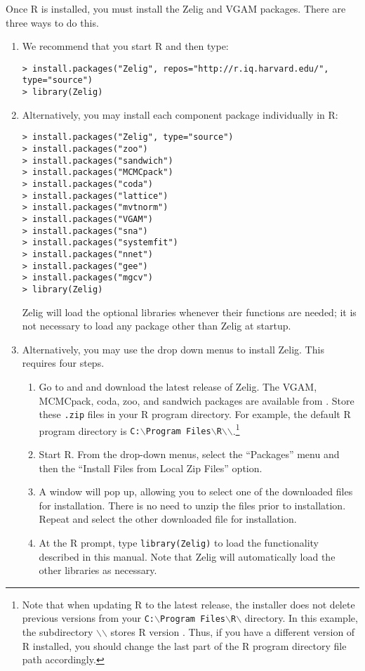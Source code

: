 Once R is installed, you must install the Zelig and VGAM packages.  There
are three ways to do this.  
\begin{enumerate}
\item We recommend that you start R and then type:
\begin{verbatim}
> install.packages("Zelig", repos="http://r.iq.harvard.edu/", type="source")
> library(Zelig)
\end{verbatim}
\item Alternatively, you may install each component package individually 
in R:
\begin{verbatim}
> install.packages("Zelig", type="source")
> install.packages("zoo")
> install.packages("sandwich")
> install.packages("MCMCpack")
> install.packages("coda")
> install.packages("lattice")
> install.packages("mvtnorm")
> install.packages("VGAM")
> install.packages("sna")
> install.packages("systemfit")
> install.packages("nnet")
> install.packages("gee")
> install.packages("mgcv")
> library(Zelig)
\end{verbatim}
Zelig will load the optional libraries whenever their functions are
needed; it is not necessary to load any package other than Zelig at startup.  

\item \label{manual.windows}Alternatively, you may use the drop down
  menus to install Zelig.  This requires four steps.
\begin{enumerate}
\item \label{win.zelig} Go to  and
  and download the latest release of Zelig.  The VGAM, MCMCpack,
coda, zoo, and sandwich packages are available from
.  Store these
  \texttt{.zip} files in your R program directory.  For example, the
  default R program directory is {\tt C:$\backslash$Program
  Files$\backslash$R$\backslash$\rwvers$\backslash$}.\footnote{Note
  that when updating R to the latest release, the installer does not
  delete previous versions from your {\tt C:$\backslash$Program
  Files$\backslash$R$\backslash$} directory.  In this example, the
  subdirectory {\tt $\backslash$\rwvers$\backslash$} stores R version
  \fullrvers.  Thus, if you have a different version of R installed,
  you should change the last part of the R program directory file path
  accordingly.}
\item Start R.  From the drop-down menus, select the ``Packages'' menu
  and then the ``Install Files from Local Zip Files'' option.
\item A window will pop up, allowing you to select one of the
  downloaded files for installation.  There is no need to unzip the
  files prior to installation.  Repeat and select the other downloaded
  file for installation.
\item At the R prompt, type \texttt{library(Zelig)} to load the
  functionality described in this manual.  Note that Zelig will
  automatically load the other libraries as necessary.
\end{enumerate}


\end{enumerate}
